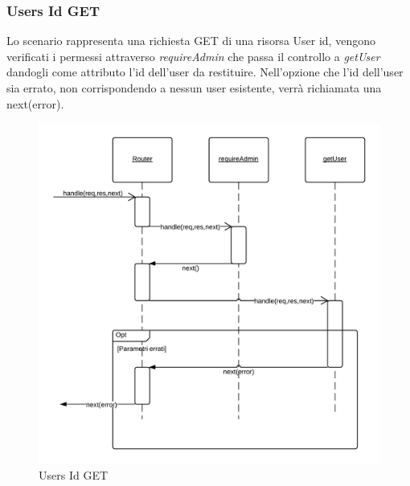 \subsubsection{Users Id GET} 
Lo scenario rappresenta una richiesta GET di una risorsa User id, vengono verificati i permessi attraverso \emph{requireAdmin} che passa il controllo a \emph{getUser} dandogli come attributo l'id dell'user da restituire.
Nell'opzione che l'id dell'user sia errato, non corrispondendo a nessun user esistente, verrà richiamata una next(error).
\begin{figure}[H]
	\begin{center} 
		\includegraphics[scale=0.20]{scenari/Users Id GET.png} 
		\caption{Users Id GET}
	\end{center} 
\end{figure}

